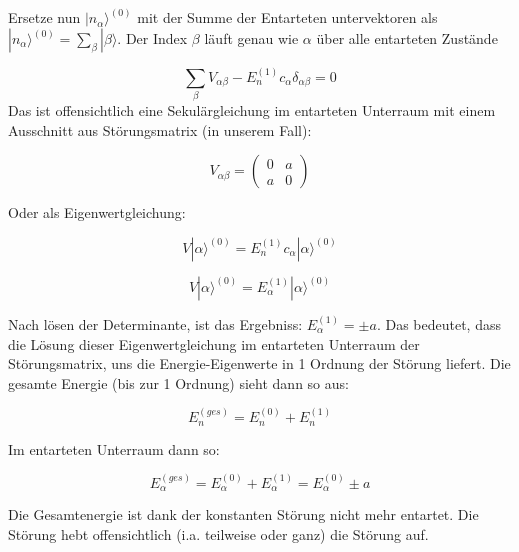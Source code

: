 Ersetze nun \(|n_\alpha\rangle^{(0)}\) mit der Summe der Entarteten untervektoren als \(|n_\alpha\rangle^{(0)} = \sum_\beta |\beta\rangle \). Der Index \(\beta\) läuft genau wie \(\alpha\) über alle entarteten Zustände

\[\sum_\beta V_{\alpha\beta}-E_n^{(1)}c_\alpha  \delta_{\alpha\beta} = 0\]
Das ist offensichtlich eine Sekulärgleichung im entarteten Unterraum mit einem Ausschnitt aus Störungsmatrix (in unserem Fall):

\[V_{\alpha\beta} = \begin{pmatrix}0&a\\ a&0 \end{pmatrix} \]

Oder als Eigenwertgleichung:


\[V|\alpha\rangle ^{(0)} = E_n^{(1)}c_\alpha|\alpha\rangle ^{(0)}  \]

\[V|\alpha\rangle ^{(0)} = E_\alpha^{(1)} |\alpha\rangle ^{(0)}  \]

Nach lösen der Determinante, ist das Ergebniss:  \(E_\alpha^{(1)} = \pm a \).  Das bedeutet, dass die Lösung dieser Eigenwertgleichung im entarteten Unterraum der Störungsmatrix, uns die Energie-Eigenwerte in 1 Ordnung der Störung liefert. Die gesamte Energie (bis zur 1 Ordnung) sieht dann so aus:

\[E_n^{(ges)} = E_n^{(0)}+E_n^{(1)}\]

Im entarteten Unterraum dann so:

\[E_\alpha^{(ges)} = E_\alpha^{(0)}+E_\alpha^{(1)} =E_\alpha^{(0)}\pm a \]

Die Gesamtenergie ist dank der konstanten Störung nicht mehr entartet. Die Störung hebt offensichtlich (i.a. teilweise oder ganz) die Störung auf.






